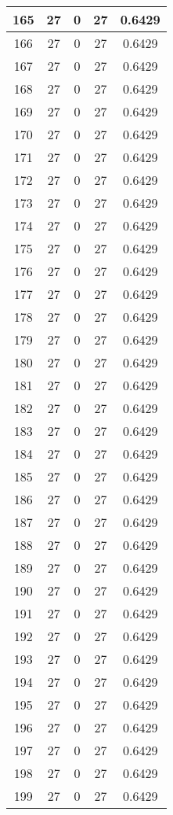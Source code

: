 \documentclass[letterpaper, 12pt]{article}
\begin{document}
\begin{longtable}{|c|c|c|c|c|}
\hline
165 & 27 & 0 & 27 & 0.6429 \\
\hline
166 & 27 & 0 & 27 & 0.6429 \\
\hline
167 & 27 & 0 & 27 & 0.6429 \\
\hline
168 & 27 & 0 & 27 & 0.6429 \\
\hline
169 & 27 & 0 & 27 & 0.6429 \\
\hline
170 & 27 & 0 & 27 & 0.6429 \\
\hline
171 & 27 & 0 & 27 & 0.6429 \\
\hline
172 & 27 & 0 & 27 & 0.6429 \\
\hline
173 & 27 & 0 & 27 & 0.6429 \\
\hline
174 & 27 & 0 & 27 & 0.6429 \\
\hline
175 & 27 & 0 & 27 & 0.6429 \\
\hline
176 & 27 & 0 & 27 & 0.6429 \\
\hline
177 & 27 & 0 & 27 & 0.6429 \\
\hline
178 & 27 & 0 & 27 & 0.6429 \\
\hline
179 & 27 & 0 & 27 & 0.6429 \\
\hline
180 & 27 & 0 & 27 & 0.6429 \\
\hline
181 & 27 & 0 & 27 & 0.6429 \\
\hline
182 & 27 & 0 & 27 & 0.6429 \\
\hline
183 & 27 & 0 & 27 & 0.6429 \\
\hline
184 & 27 & 0 & 27 & 0.6429 \\
\hline
185 & 27 & 0 & 27 & 0.6429 \\
\hline
186 & 27 & 0 & 27 & 0.6429 \\
\hline
187 & 27 & 0 & 27 & 0.6429 \\
\hline
188 & 27 & 0 & 27 & 0.6429 \\
\hline
189 & 27 & 0 & 27 & 0.6429 \\
\hline
190 & 27 & 0 & 27 & 0.6429 \\
\hline
191 & 27 & 0 & 27 & 0.6429 \\
\hline
192 & 27 & 0 & 27 & 0.6429 \\
\hline
193 & 27 & 0 & 27 & 0.6429 \\
\hline
194 & 27 & 0 & 27 & 0.6429 \\
\hline
195 & 27 & 0 & 27 & 0.6429 \\
\hline
196 & 27 & 0 & 27 & 0.6429 \\
\hline
197 & 27 & 0 & 27 & 0.6429 \\
\hline
198 & 27 & 0 & 27 & 0.6429 \\
\hline
199 & 27 & 0 & 27 & 0.6429 \\
\hline
\end{longtable}
\end{document}
